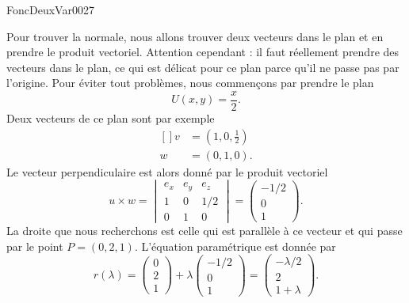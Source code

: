 \begin{corrige}{FoncDeuxVar0027}
\begin{enumerate}
			Pour trouver la normale, nous allons trouver deux vecteurs dans le plan et en prendre le produit vectoriel. Attention cependant : il faut réellement prendre des vecteurs dans le plan, ce qui est délicat pour ce plan parce qu'il ne passe pas par l'origine. Pour éviter tout problèmes, nous commençons par prendre le plan
			\begin{equation}
				U(x,y)=\frac{ x }{ 2 }.
			\end{equation}
			Deux vecteurs de ce plan sont par exemple
			\begin{equation}
				\begin{aligned}[]
					v&=(1,0,\frac{ 1 }{2})\\
					w&=(0,1,0).
				\end{aligned}
			\end{equation}
			Le vecteur perpendiculaire est alors donné par le produit vectoriel
			\begin{equation}
				u\times w=
				\begin{vmatrix}
					e_x	&	e_y	&	e_z	\\
					1	&	0	&	1/2	\\
					0	&	1	&	0
				\end{vmatrix}=
				\begin{pmatrix}
					-1/2	\\ 
					0	\\ 
					1	
				\end{pmatrix}.
			\end{equation}
			La droite que nous recherchons est celle qui est parallèle à ce vecteur et qui passe par le point $P=(0,2,1)$. L'équation paramétrique est donnée par
			\begin{equation}
				r(\lambda)=
				\begin{pmatrix}
					0	\\ 
					2	\\ 
					1	
				\end{pmatrix}+\lambda
				\begin{pmatrix}
					-1/2	\\ 
					0	\\ 
					1	
				\end{pmatrix}=
				\begin{pmatrix}
					-\lambda/2	\\ 
					2	\\ 
					1+\lambda	
				\end{pmatrix}.
			\end{equation}

	\end{enumerate}

\end{corrige}

